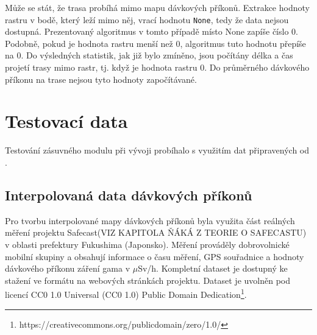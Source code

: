 %			
%		

Může se stát, že trasa probíhá mimo mapu dávkových příkonů. Extrakce hodnoty rastru v bodě, který leží mimo něj, vrací hodnotu \texttt{None}, tedy že data nejsou dostupná. Prezentovaný algoritmus v tomto případě místo None zapíše číslo 0. Podobně, pokud je hodnota rastru menší než 0, algoritmus tuto hodnotu přepíše na 0. Do výsledných statistik, jak již bylo zmíněno, jsou počítány délka a čas projetí trasy mimo rastr, tj. když je hodnota rastru 0. Do průměrného dávkového příkonu na trase nejsou tyto hodnoty započítávané. 


\section{Testovací data}
Testování zásuvného modulu při vývoji probíhalo s využitím dat připravených od .

\subsection{Interpolovaná data dávkových příkonů}
Pro tvorbu interpolované mapy dávkových příkonů byla využita část reálných měření projektu Safecast(VIZ KAPITOLA ŇÁKÁ Z TEORIE O SAFECASTU)
v oblasti prefektury Fukushima (Japonsko). Měření prováděly dobrovolnické mobilní skupiny a obsahují informace o času měření, GPS souřadnice a hodnoty dávkového příkonu záření gama v $\mu$Sv/h. Kompletní dataset je dostupný ke stažení ve formátu  na webových stránkách projektu. Dataset je uvolněn pod licencí CC0 1.0 Universal (CC0 1.0) Public Domain Dedication\footnote{https://creativecommons.org/publicdomain/zero/1.0/}. 

